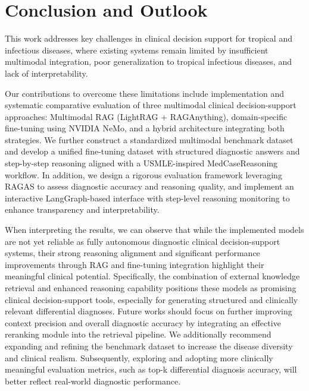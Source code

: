 \section{Conclusion and Outlook}
\label{sec:conclusion}

This work addresses key challenges in clinical decision support for tropical and infectious diseases, where existing systems remain limited by insufficient multimodal integration, poor generalization to tropical infectious diseases, and lack of interpretability.


Our contributions to overcome these limitations include implementation and systematic comparative evaluation of three multimodal clinical decision-support approaches: Multimodal \ac{RAG} (LightRAG + RAGAnything), 
domain-specific fine-tuning using NVIDIA NeMo, and a hybrid architecture integrating both strategies. We further construct a standardized multimodal benchmark dataset and develop a 
unified fine-tuning dataset with structured diagnostic answers and step-by-step reasoning aligned with a USMLE-inspired MedCaseReasoning workflow. In addition, we design a rigorous 
evaluation framework leveraging RAGAS to assess diagnostic accuracy and reasoning quality, and implement an interactive LangGraph-based interface with step-level reasoning monitoring 
to enhance transparency and interpretability. 

When interpreting the results, we can observe that while the implemented models are not yet reliable as fully autonomous diagnostic clinical decision-support systems, 
their strong reasoning alignment and significant performance improvements through RAG and fine-tuning integration highlight their meaningful clinical potential. Specifically, the combination of external knowledge 
retrieval and enhanced reasoning capability positions these models as promising clinical decision-support tools, especially for generating structured and clinically relevant differential diagnoses. 
Future works should focus on further improving context precision and overall diagnostic accuracy by integrating an effective reranking module into the retrieval pipeline.
We additionally recommend expanding and refining the benchmark dataset to increase the disease diversity and clinical realism. Subsequently, exploring and adopting more clinically
meaningful evaluation metrics, such as top-k differential diagnosis accuracy, will better reflect real-world diagnostic performance.